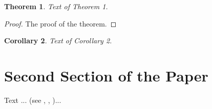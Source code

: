 \documentclass[12pt]{article}
\theoremstyle{theorem}
\newtheorem{theorem}{Theorem}
\newtheorem{corollary}[theorem]{Corollary}
\theoremstyle{defi}
\begin{document}
\begin{theorem}
Text of Theorem 1.
\end{theorem}

\begin{proof}
The proof of the theorem.
\end{proof}

\begin{corollary}
Text of Corollary 2.
\end{corollary}

\section{Second Section of the Paper}

Text ... (see \cite{gasrah}, \cite{rosbl}, \cite{Moak})...
\end{document}
